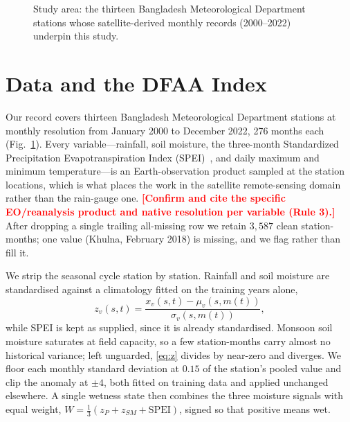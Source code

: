 \documentclass[conference]{IEEEtran}
\newcommand{\todo}[1]{\textbf{\textcolor{red}{[#1]}}}
\begin{document}
\begin{figure}[t]
\centering
\fbox{\begin{minipage}[c][2.3cm][c]{0.93\columnwidth}\centering
\todo{Insert STUDY-AREA MAP (half column): the 13 BMD stations over Bangladesh, with relief/river network.}
\end{minipage}}
\caption{Study area: the thirteen Bangladesh Meteorological Department stations whose satellite-derived
monthly records (2000--2022) underpin this study.}
\label{fig:study}
\end{figure}

\section{Data and the DFAA Index}
Our record covers thirteen Bangladesh Meteorological Department stations at monthly resolution from
January 2000 to December 2022, 276 months each (Fig.~\ref{fig:study}). Every variable---rainfall, soil
moisture, the three-month Standardized Precipitation Evapotranspiration Index (SPEI)~\cite{vicente2010}, and daily
maximum and minimum temperature---is an Earth-observation product sampled at the station locations, which is what
places the work in the satellite remote-sensing domain rather than the rain-gauge one.
\todo{Confirm and cite the specific EO/reanalysis product and native resolution per variable (Rule 3).}
After dropping a single trailing all-missing row we retain $3{,}587$ clean station-months; one value
(Khulna, February 2018) is missing, and we flag rather than fill it.

We strip the seasonal cycle station by station. Rainfall and soil moisture are standardised against a
climatology fitted on the training years alone,
\begin{equation}
z_v(s,t)=\frac{x_v(s,t)-\mu_v\!\left(s,m(t)\right)}{\sigma_v\!\left(s,m(t)\right)},
\label{eq:z}
\end{equation}
while SPEI is kept as supplied, since it is already standardised. Monsoon soil moisture saturates at
field capacity, so a few station-months carry almost no historical variance; left unguarded,
\eqref{eq:z} divides by near-zero and diverges. We floor each monthly standard deviation at $0.15$ of
the station's pooled value and clip the anomaly at $\pm4$, both fitted on training data and applied
unchanged elsewhere. A single wetness state then combines the three moisture signals with equal weight,
$W=\tfrac{1}{3}\left(z_P+z_{SM}+\mathrm{SPEI}\right)$, signed so that positive means wet.
\end{document}
